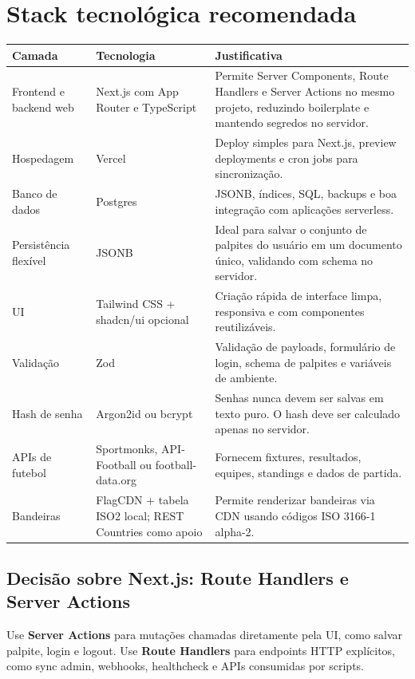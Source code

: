 \documentclass[12pt,a4paper]{article}
\begin{document}
\section{Stack tecnológica recomendada}

\begin{longtable}{p{}p{}p{}}
\toprule
\textbf{Camada} & \textbf{Tecnologia} & \textbf{Justificativa} \\
\midrule
Frontend e backend web & Next.js com App Router e TypeScript & Permite Server Components, Route Handlers e Server Actions no mesmo projeto, reduzindo boilerplate e mantendo segredos no servidor. \\
Hospedagem & Vercel & Deploy simples para Next.js, preview deployments e cron jobs para sincronização. \\
Banco de dados & Postgres & JSONB, índices, SQL, backups e boa integração com aplicações serverless. \\
Persistência flexível & JSONB & Ideal para salvar o conjunto de palpites do usuário em um documento único, validando com schema no servidor. \\
UI & Tailwind CSS + shadcn/ui opcional & Criação rápida de interface limpa, responsiva e com componentes reutilizáveis. \\
Validação & Zod & Validação de payloads, formulário de login, schema de palpites e variáveis de ambiente. \\
Hash de senha & Argon2id ou bcrypt & Senhas nunca devem ser salvas em texto puro. O hash deve ser calculado apenas no servidor. \\
APIs de futebol & Sportmonks, API-Football ou football-data.org & Fornecem fixtures, resultados, equipes, standings e dados de partida. \\
Bandeiras & FlagCDN + tabela ISO2 local; REST Countries como apoio & Permite renderizar bandeiras via CDN usando códigos ISO 3166-1 alpha-2. \\
\bottomrule
\end{longtable}

\subsection{Decisão sobre Next.js: Route Handlers e Server Actions}

Use \textbf{Server Actions} para mutações chamadas diretamente pela UI, como salvar palpite, login e logout. Use \textbf{Route Handlers} para endpoints HTTP explícitos, como sync admin, webhooks, healthcheck e APIs consumidas por scripts.
\end{document}
